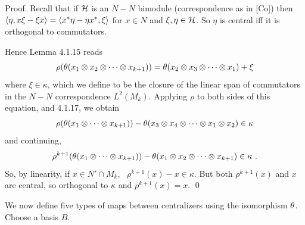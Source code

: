 {\sc Proof.}  Recall that if ${\cal H}$ is an $N-N$ bimodule
(correspondence as in [Co]) then
$\langle\eta,x\xi-\xi x\rangle=\langle x^*\eta-\eta x^*,\xi\rangle$ for $x\in N$
and $\xi,\eta\in{\cal H}$. So $\eta$ is central iff it is orthogonal
to commutators.

Hence Lemma 4.1.15 reads
$$
\rho(\theta(x_1\otimes x_2\otimes\dots\otimes x_{k+1}))  =
\theta(x_2\otimes x_3\otimes\dots\otimes x_1) +\xi
$$
where $\xi\in \kappa$, which we define to be the closure of the
linear span of commutators in the $N-N$ correspondence $L^2(M_k)$.
Applying $\rho$ to both sides of this equation, and 4.1.17, we
obtain
$$
\rho(\theta(x_1\otimes \dots\otimes x_{k+1}))  -
\theta(x_3\otimes x_4\otimes\dots\otimes x_1\otimes x_2) \in \kappa
$$
and continuing,
$$
\rho^{k+1}(\theta(x_1\otimes\dots\otimes x_{k+1}))
-\theta(x_1\otimes x_2\otimes\dots\otimes x_{k+1})\in \kappa \ .
$$
So, by linearity, if $x\in N'\cap M_k$, \
$\rho^{k+1}(x)-x\in \kappa$. But both $\rho^{k+1}(x)$ and $x$ are
central, so orthogonal to $\kappa$ and
$\rho^{k+1}(x)=x$. \qed

\bs We now define five types of maps between centralizers using the
isomorphism $\theta$. Choose a basis $B$.


